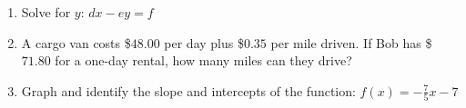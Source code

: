 \documentclass[11pt]{article}
\begin{document}
\begin{enumerate}
{
}

\newpage

% 

\item %
\providecommand{\stxKnowl}{}\renewcommand{\stxKnowl}[1]{#1}
\providecommand{\stxOuttro}{}\renewcommand{\stxOuttro}[1]{#1}
\providecommand{\stxTitle}{}\renewcommand{\stxTitle}[1]{#1}
\renewcommand{\stxOuttro}[1]{}
\stxKnowl{
 Solve for \(y\): \(dx - ey = f\) 

\stxOuttro{
SOLUTION

 \(dx - ey = f\) 

 \(-ey = f - dx\) 

 \(\boxed{ y = \frac{dx - f}{e} }\) 

}
}

\newpage

% 

\item %
\providecommand{\stxKnowl}{}\renewcommand{\stxKnowl}[1]{#1}
\providecommand{\stxOuttro}{}\renewcommand{\stxOuttro}[1]{#1}
\providecommand{\stxTitle}{}\renewcommand{\stxTitle}[1]{#1}
\renewcommand{\stxOuttro}[1]{}
\stxKnowl{
 A cargo van costs \$\(48.00\) per day plus \$\(0.35\) per mile driven. If Bob has \$\(71.80\) for a one-day rental, how many miles can they drive? 

\stxOuttro{
SOLUTION

 \(71.80 - 48.00 = 23.80\) 

 \(\frac{23.80}{0.35} = 68\) 

 \(\boxed{ 68 \text{ miles} }\) 

}
}

\newpage

% 

\item %
\providecommand{\stxKnowl}{}\renewcommand{\stxKnowl}[1]{#1}
\providecommand{\stxOuttro}{}\renewcommand{\stxOuttro}[1]{#1}
\providecommand{\stxTitle}{}\renewcommand{\stxTitle}[1]{#1}
\renewcommand{\stxOuttro}[1]{}
\stxKnowl{
 Graph and identify the slope and intercepts of the function: \(f(x) = \displaystyle{ -\frac{7}{5} }x - 7\) 

}
\end{enumerate}
\end{document}
